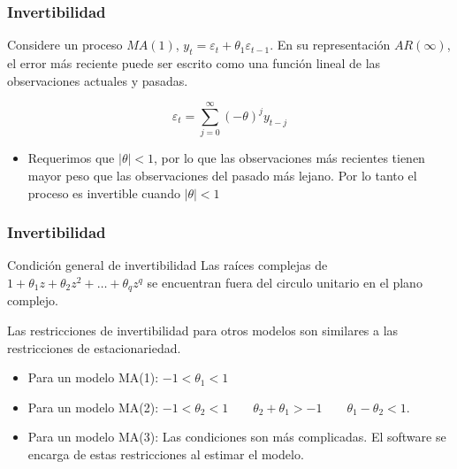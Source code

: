 \documentclass[10pt]{beamer}
\begin{document}


\begin{frame}[fragile]
\frametitle{Invertibilidad}


Considere un proceso $MA(1)$, $y_t = \varepsilon_t + \theta_1 \varepsilon_{t-1}$. En su representación $AR(\infty)$, el error más reciente puede ser escrito como una función lineal de las observaciones actuales y pasadas.


\begin{equation}
\varepsilon_t = \sum_{j=0}^{\infty} (-\theta)^j y_{t-j}
\end{equation}


\begin{itemize}
\item Requerimos que $|\theta| < 1$, por lo que las observaciones más recientes tienen mayor peso que las observaciones del pasado más lejano. Por lo tanto el proceso es invertible cuando $|\theta| < 1$

\end{itemize}

\end{frame}





\begin{frame}[fragile]
\frametitle{Invertibilidad}


\begin{block}{Condición general de invertibilidad}
Las raíces complejas de $1+\theta_1 z + \theta_2 z^2 + \dots + \theta_qz^q$ se encuentran fuera del circulo unitario en el plano complejo.
\end{block}

\vspace{4mm}

Las restricciones de invertibilidad para otros modelos son similares a las restricciones de estacionariedad.

\vspace{3mm}

\begin{itemize}
\item Para un modelo MA(1): $-1 < \theta_1 < 1$
\item Para un modelo MA(2): $-1<\theta_2<1\qquad \theta_2+\theta_1 >-1 \qquad \theta_1 -\theta_2 < 1$.
\item Para un modelo MA(3): Las condiciones son más complicadas. El software se encarga de estas restricciones al estimar el modelo.
\end{itemize}

\end{frame}
\end{document}
